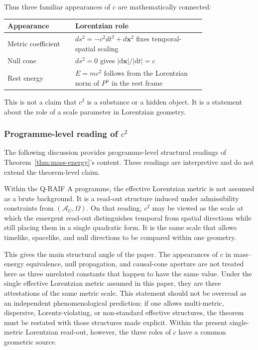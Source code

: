 \documentclass[12pt,a4paper]{article}
\theoremstyle{definition}
\theoremstyle{remark}
\newcommand{\AU}{\mathcal{A}_U}
\newcommand{\Omegastate}{\Omega}
\begin{document}
Thus three familiar appearances of $c$ are mathematically connected:

\begin{center}
\begin{tabular}{P{0.27\linewidth}P{0.52\linewidth}}
\toprule
\textbf{Appearance} & \textbf{Lorentzian role} \\
\midrule
Metric coefficient & $ds^2=-c^2dt^2+d\mathbf{x}^2$ fixes temporal-spatial scaling \\
Null cone & $ds^2=0$ gives $|\mathrm d\mathbf{x}|/|\mathrm dt|=c$ \\
Rest energy & $E=mc^2$ follows from the Lorentzian norm of $P^\mu$ in the rest frame \\
\bottomrule
\end{tabular}
\end{center}

This is not a claim that $c^2$ is a substance or a hidden object. It is a statement about the role of a scale parameter in Lorentzian geometry.

\subsubsection{Programme-level reading of \texorpdfstring{$c^2$}{c2}}

The following discussion provides programme-level structural readings of Theorem~\ref{thm:mass-energy}'s content. These readings are interpretive and do not extend the theorem-level claim.

Within the Q-RAIF A programme, the effective Lorentzian metric is not assumed as a brute background. It is a read-out structure induced under admissibility constraints from $(\AU,\Omegastate)$. On that reading, $c^2$ may be viewed as the scale at which the emergent read-out distinguishes temporal from spatial directions while still placing them in a single quadratic form. It is the same scale that allows timelike, spacelike, and null directions to be compared within one geometry.

This gives the main structural angle of the paper. The appearances of $c$ in mass--energy equivalence, null propagation, and causal-cone aperture are not treated here as three unrelated constants that happen to have the same value. Under the single effective Lorentzian metric assumed in this paper, they are three attestations of the same metric scale. This statement should not be overread as an independent phenomenological prediction: if one allows multi-metric, dispersive, Lorentz-violating, or non-standard effective structures, the theorem must be restated with those structures made explicit. Within the present single-metric Lorentzian read-out, however, the three roles of $c$ have a common geometric source.
\end{document}
